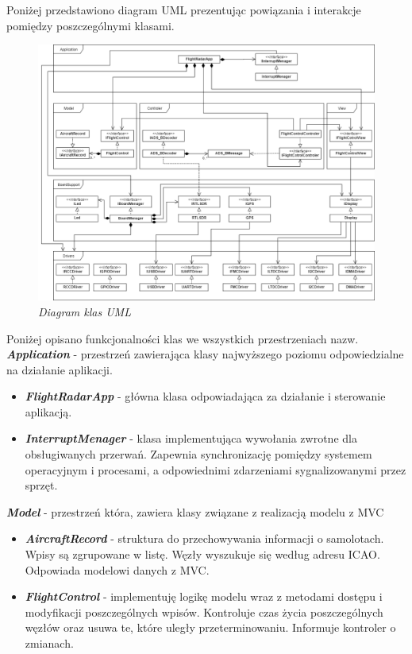 \documentclass[eng,printmode]{mgr}
\begin{document}
Poniżej przedstawiono diagram UML prezentując powiązania i interakcje pomiędzy poszczególnymi klasami.
\vskip 0.55cm
\begin{figure}[!h]
    \centering
    \includegraphics[height=\textwidth, angle=90]{plots/uml.png}
    \caption{\textit{Diagram klas UML}}
\end{figure}

\noindent
Poniżej opisano funkcjonalności klas we wszystkich przestrzeniach nazw.
\\


\noindent
\textbf{\textit{Application}} - przestrzeń zawierająca klasy najwyższego poziomu odpowiedzialne na działanie aplikacji.
\begin{itemize}[label={}]
  \item \textbf{\textit{FlightRadarApp}} - główna klasa odpowiadająca za działanie i sterowanie aplikacją.
  \item \textbf{\textit{InterruptMenager}} - klasa implementująca wywołania zwrotne dla obsługiwanych przerwań. Zapewnia synchronizację pomiędzy systemem operacyjnym i procesami, a odpowiednimi zdarzeniami sygnalizowanymi przez sprzęt.
\end{itemize}
\vskip 0.55cm

\noindent
\textbf{\textit{Model}} - przestrzeń która, zawiera klasy związane z realizacją modelu z MVC
\begin{itemize}[label={}]
  \item \textbf{\textit{AircraftRecord}} - struktura do przechowywania informacji o samolotach. Wpisy są zgrupowane w listę. Węzły wyszukuje się według adresu ICAO. Odpowiada modelowi danych z MVC.
  \item \textbf{\textit{FlightControl}} - implementuję logikę modelu wraz z metodami dostępu i modyfikacji poszczególnych wpisów. Kontroluje czas życia poszczególnych węzłów oraz usuwa te, które uległy przeterminowaniu. Informuje kontroler o zmianach.
\end{itemize}
\vskip 0.55cm
\end{document}
